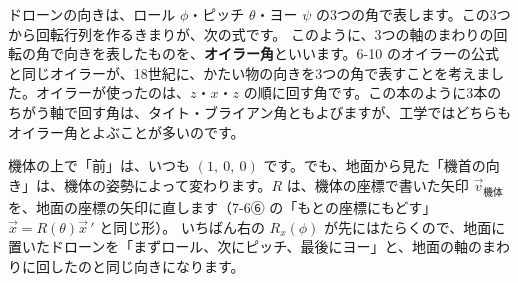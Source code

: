 


\label{bk:7-7:euler}ドローンの向きは、ロール $\phi$・ピッチ $\theta$・ヨー $\psi$ の3つの角で表します。この3つから回転行列を作るきまりが、次の式です。
このように、3つの軸のまわりの回転の角で向きを表したものを、\textbf{オイラー角}といいます。6-10 のオイラーの公式と同じオイラーが、18世紀に、かたい物の向きを3つの角で表すことを考えました。オイラーが使ったのは、$z$・$x$・$z$ の順に回す角です。この本のように3本のちがう軸で回す角は、タイト・ブライアン角ともよびますが、工学ではどちらもオイラー角とよぶことが多いのです。

機体の上で「前」は、いつも $(1,\ 0,\ 0)$ です。でも、地面から見た「機首の向き」は、機体の姿勢によって変わります。$R$ は、機体の座標で書いた矢印 $\vec v_{\text{機体}}$ を、地面の座標の矢印に直します（7-6⑥ の「もとの座標にもどす」$\vec x=R(\theta)\vec x\,'$ と同じ形）。
いちばん右の $R_x(\phi)$ が先にはたらくので、地面に置いたドローンを「まずロール、次にピッチ、最後にヨー」と、地面の軸のまわりに回したのと同じ向きになります。

